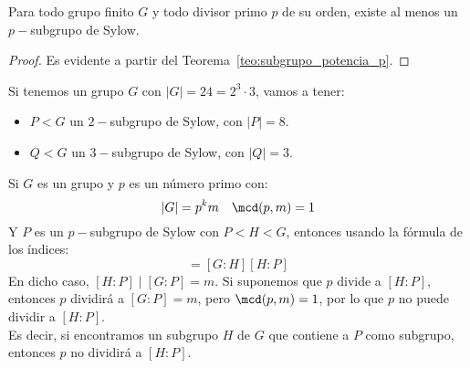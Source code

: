 \begin{coro}
    Para todo grupo finito $G$ y todo divisor primo $p$ de su orden, existe al menos un $p-$subgrupo de Sylow.
    \begin{proof}
        Es evidente a partir del Teorema~\ref{teo:subgrupo_potencia_p}.
    \end{proof}
\end{coro}

\begin{ejemplo}
    Si tenemos un grupo $G$ con $|G| = 24 = 2^3 \cdot 3$, vamos a tener:
    \begin{itemize}
        \item $P<G$ un $2-$subgrupo de Sylow, con $|P| = 8$.
        \item $Q<G$ un $3-$subgrupo de Sylow, con $|Q| = 3$.
    \end{itemize}
\end{ejemplo}

\begin{observacion}
    Si $G$ es un grupo y $p$ es un número primo con:
    \begin{equation*}
        |G| = p^k m \quad \mcd(p,m) = 1
    \end{equation*}
    Y $P$ es un $p-$subgrupo de Sylow con $P<H<G$, entonces usando la fórmula de los índices:
    \begin{equation*}
        [G:P] = [G:H][H:P]
    \end{equation*}
    En dicho caso, $[H:P] \mid [G:P] = m$. Si suponemos que $p$ divide a $[H:P]$, entonces $p$ dividirá a $[G:P] = m$, pero $\mcd(p,m) = 1$, por lo que $p$ no puede dividir a $[H:P]$.\\

    \noindent
    Es decir, si encontramos un subgrupo $H$ de $G$ que contiene a $P$ como subgrupo, entonces $p$ no dividirá a $[H:P]$.
\end{observacion}~\\

